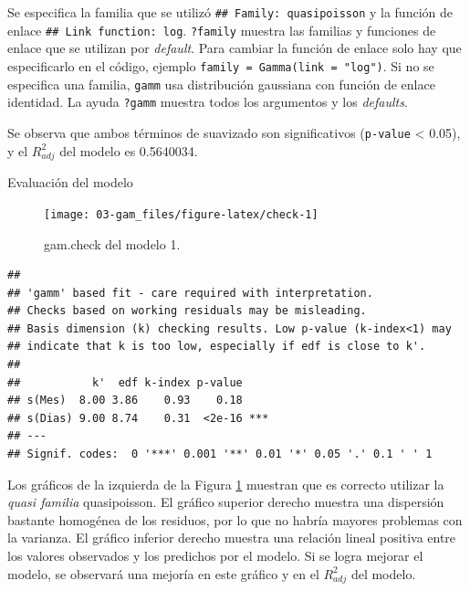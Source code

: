 \documentclass[
]{book}
\newenvironment{Shaded}{\begin{snugshade}}{\end{snugshade}}
\newcommand{\AttributeTok}[1]{\textcolor[rgb]{0.77,0.63,0.00}{#1}}
\newcommand{\DecValTok}[1]{\textcolor[rgb]{0.00,0.00,0.81}{#1}}
\newcommand{\FunctionTok}[1]{\textcolor[rgb]{0.00,0.00,0.00}{#1}}
\newcommand{\NormalTok}[1]{#1}
\newcommand{\SpecialCharTok}[1]{\textcolor[rgb]{0.00,0.00,0.00}{#1}}
\newcommand{\StringTok}[1]{\textcolor[rgb]{0.31,0.60,0.02}{#1}}
\begin{document}
Se especifica la familia que se utilizó \texttt{\#\#\ Family:\ quasipoisson} y la función de enlace \texttt{\#\#\ Link\ function:\ log}. \texttt{?family} muestra las familias y funciones de enlace que se utilizan por \emph{default}. Para cambiar la función de enlace solo hay que especificarlo en el código, ejemplo \texttt{family\ =\ Gamma(link\ =\ "log")}. Si no se especifica una familia, \texttt{gamm} usa distribución gaussiana con función de enlace identidad. La ayuda \texttt{?gamm} muestra todos los argumentos y los \emph{defaults}.

Se observa que ambos términos de suavizado son significativos (\texttt{p-value} \textless{} 0.05), y el \(R_{adj}^{2}\) del modelo es 0.5640034.

Evaluación del modelo

\begin{Shaded}
\end{Shaded}

\begin{figure}

{\centering \texttt{[image: 03-gam\_files/figure-latex/check-1]} 

}

\caption{gam.check del modelo 1.}\label{fig:check}
\end{figure}

\begin{verbatim}
## 
## 'gamm' based fit - care required with interpretation.
## Checks based on working residuals may be misleading.
## Basis dimension (k) checking results. Low p-value (k-index<1) may
## indicate that k is too low, especially if edf is close to k'.
## 
##           k'  edf k-index p-value    
## s(Mes)  8.00 3.86    0.93    0.18    
## s(Dias) 9.00 8.74    0.31  <2e-16 ***
## ---
## Signif. codes:  0 '***' 0.001 '**' 0.01 '*' 0.05 '.' 0.1 ' ' 1
\end{verbatim}

Los gráficos de la izquierda de la Figura \ref{fig:check} muestran que es correcto utilizar la \emph{quasi familia} quasipoisson. El gráfico superior derecho muestra una dispersión bastante homogénea de los residuos, por lo que no habría mayores problemas con la varianza. El gráfico inferior derecho muestra una relación lineal positiva entre los valores observados y los predichos por el modelo. Si se logra mejorar el modelo, se observará una mejoría en este gráfico y en el \(R_{adj}^{2}\) del modelo.
\end{document}
